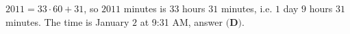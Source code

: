 $2011=33\cdot60+31$, so $2011$ minutes is $33$ hours $31$ minutes, i.e. $1$ day $9$ hours $31$ minutes. The time is January $2$ at 9:31 AM, answer $\boxed{\textbf{(D)}}$.
